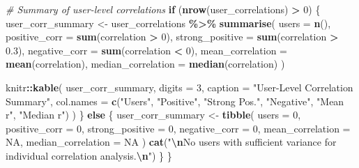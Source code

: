 \documentclass[
]{article}
\newenvironment{Shaded}{\begin{snugshade}}{\end{snugshade}}
\newcommand{\AttributeTok}[1]{\textcolor[rgb]{0.13,0.29,0.53}{#1}}
\newcommand{\CommentTok}[1]{\textcolor[rgb]{0.56,0.35,0.01}{\textit{#1}}}
\newcommand{\ConstantTok}[1]{\textcolor[rgb]{0.56,0.35,0.01}{#1}}
\newcommand{\ControlFlowTok}[1]{\textcolor[rgb]{0.13,0.29,0.53}{\textbf{#1}}}
\newcommand{\DecValTok}[1]{\textcolor[rgb]{0.00,0.00,0.81}{#1}}
\newcommand{\FloatTok}[1]{\textcolor[rgb]{0.00,0.00,0.81}{#1}}
\newcommand{\FunctionTok}[1]{\textcolor[rgb]{0.13,0.29,0.53}{\textbf{#1}}}
\newcommand{\NormalTok}[1]{#1}
\newcommand{\OtherTok}[1]{\textcolor[rgb]{0.56,0.35,0.01}{#1}}
\newcommand{\SpecialCharTok}[1]{\textcolor[rgb]{0.81,0.36,0.00}{\textbf{#1}}}
\newcommand{\StringTok}[1]{\textcolor[rgb]{0.31,0.60,0.02}{#1}}
\begin{document}
\begin{Shaded}
\begin{Highlighting}[]
    \CommentTok{\# Summary of user{-}level correlations}
    \ControlFlowTok{if}\NormalTok{ (}\FunctionTok{nrow}\NormalTok{(user\_correlations) }\SpecialCharTok{\textgreater{}} \DecValTok{0}\NormalTok{) \{}
\NormalTok{        user\_corr\_summary }\OtherTok{\textless{}{-}}\NormalTok{ user\_correlations }\SpecialCharTok{\%\textgreater{}\%}
            \FunctionTok{summarise}\NormalTok{(}
                \AttributeTok{users =} \FunctionTok{n}\NormalTok{(),}
                \AttributeTok{positive\_corr =} \FunctionTok{sum}\NormalTok{(correlation }\SpecialCharTok{\textgreater{}} \DecValTok{0}\NormalTok{),}
                \AttributeTok{strong\_positive =} \FunctionTok{sum}\NormalTok{(correlation }\SpecialCharTok{\textgreater{}} \FloatTok{0.3}\NormalTok{),}
                \AttributeTok{negative\_corr =} \FunctionTok{sum}\NormalTok{(correlation }\SpecialCharTok{\textless{}} \DecValTok{0}\NormalTok{),}
                \AttributeTok{mean\_correlation =} \FunctionTok{mean}\NormalTok{(correlation),}
                \AttributeTok{median\_correlation =} \FunctionTok{median}\NormalTok{(correlation)}
\NormalTok{            )}

\NormalTok{        knitr}\SpecialCharTok{::}\FunctionTok{kable}\NormalTok{(}
\NormalTok{            user\_corr\_summary,}
            \AttributeTok{digits =} \DecValTok{3}\NormalTok{,}
            \AttributeTok{caption =} \StringTok{"User{-}Level Correlation Summary"}\NormalTok{,}
            \AttributeTok{col.names =} \FunctionTok{c}\NormalTok{(}\StringTok{"Users"}\NormalTok{, }\StringTok{"Positive"}\NormalTok{, }\StringTok{"Strong Pos."}\NormalTok{, }\StringTok{"Negative"}\NormalTok{, }\StringTok{"Mean r"}\NormalTok{, }\StringTok{"Median r"}\NormalTok{)}
\NormalTok{        )}
\NormalTok{    \} }\ControlFlowTok{else}\NormalTok{ \{}
\NormalTok{        user\_corr\_summary }\OtherTok{\textless{}{-}} \FunctionTok{tibble}\NormalTok{(}
            \AttributeTok{users =} \DecValTok{0}\NormalTok{, }\AttributeTok{positive\_corr =} \DecValTok{0}\NormalTok{, }\AttributeTok{strong\_positive =} \DecValTok{0}\NormalTok{,}
            \AttributeTok{negative\_corr =} \DecValTok{0}\NormalTok{, }\AttributeTok{mean\_correlation =} \ConstantTok{NA}\NormalTok{, }\AttributeTok{median\_correlation =} \ConstantTok{NA}
\NormalTok{        )}
        \FunctionTok{cat}\NormalTok{(}\StringTok{"}\SpecialCharTok{\textbackslash{}n}\StringTok{No users with sufficient variance for individual correlation analysis.}\SpecialCharTok{\textbackslash{}n}\StringTok{"}\NormalTok{)}
\NormalTok{    \}}
\NormalTok{\}}
\end{Highlighting}
\end{Shaded}
\end{document}
